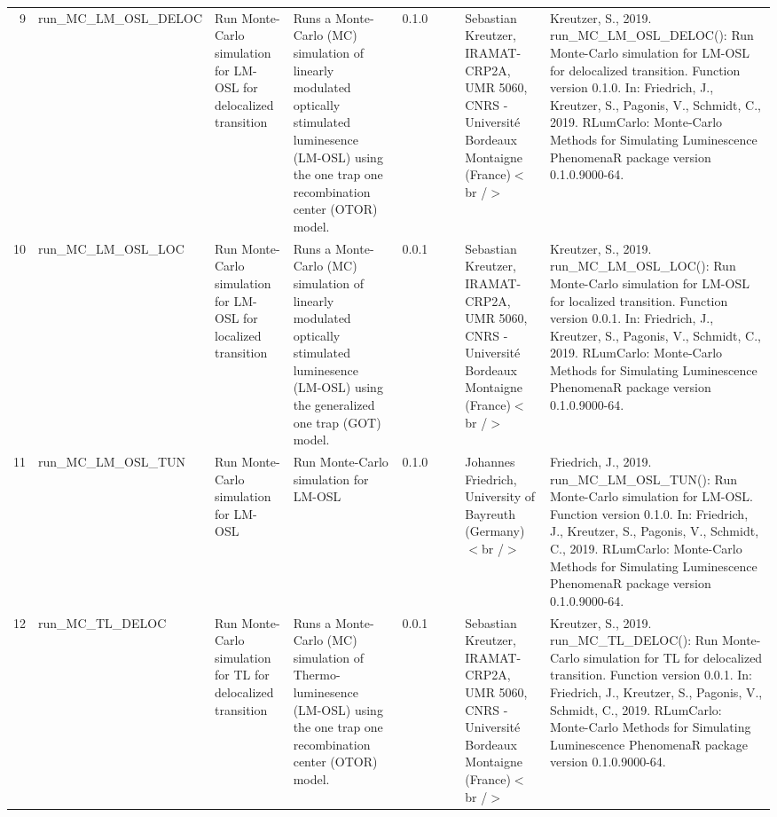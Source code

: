 \begin{table}[ht]
\begin{tabular}{rllllllll}
 \\ 
  9 & run\_MC\_LM\_OSL\_DELOC & Run Monte-Carlo simulation for LM-OSL for delocalized transition & Runs a Monte-Carlo (MC) simulation of linearly modulated optically stimulated luminesence (LM-OSL) using the one trap one recombination center (OTOR) model. & 0.1.0
 &  &  & Sebastian Kreutzer, IRAMAT-CRP2A, UMR 5060, CNRS - Université Bordeaux Montaigne (France)$<$br /$>$ & Kreutzer, S., 2019. run\_MC\_LM\_OSL\_DELOC(): Run Monte-Carlo simulation for LM-OSL for delocalized transition. Function version 0.1.0. In: Friedrich, J., Kreutzer, S., Pagonis, V., Schmidt, C., 2019. RLumCarlo: Monte-Carlo Methods for Simulating Luminescence PhenomenaR package version 0.1.0.9000-64. 
 \\ 
  10 & run\_MC\_LM\_OSL\_LOC & Run Monte-Carlo simulation for LM-OSL for localized transition & Runs a Monte-Carlo (MC) simulation of linearly modulated optically stimulated luminesence (LM-OSL) using the generalized one trap (GOT) model. & 0.0.1
 &  &  & Sebastian Kreutzer, IRAMAT-CRP2A, UMR 5060, CNRS - Université Bordeaux Montaigne (France)$<$br /$>$ & Kreutzer, S., 2019. run\_MC\_LM\_OSL\_LOC(): Run Monte-Carlo simulation for LM-OSL for localized transition. Function version 0.0.1. In: Friedrich, J., Kreutzer, S., Pagonis, V., Schmidt, C., 2019. RLumCarlo: Monte-Carlo Methods for Simulating Luminescence PhenomenaR package version 0.1.0.9000-64. 
 \\ 
  11 & run\_MC\_LM\_OSL\_TUN & Run Monte-Carlo simulation for LM-OSL & Run Monte-Carlo simulation for LM-OSL & 0.1.0
 &  &  & Johannes Friedrich, University of Bayreuth (Germany)$<$br /$>$ & Friedrich, J., 2019. run\_MC\_LM\_OSL\_TUN(): Run Monte-Carlo simulation for LM-OSL. Function version 0.1.0. In: Friedrich, J., Kreutzer, S., Pagonis, V., Schmidt, C., 2019. RLumCarlo: Monte-Carlo Methods for Simulating Luminescence PhenomenaR package version 0.1.0.9000-64. 
 \\ 
  12 & run\_MC\_TL\_DELOC & Run Monte-Carlo simulation for TL for delocalized transition & Runs a Monte-Carlo (MC) simulation of Thermo-luminesence (LM-OSL) using the one trap one recombination center (OTOR) model. & 0.0.1
 &  &  & Sebastian Kreutzer, IRAMAT-CRP2A, UMR 5060, CNRS - Université Bordeaux Montaigne (France)$<$br /$>$ & Kreutzer, S., 2019. run\_MC\_TL\_DELOC(): Run Monte-Carlo simulation for TL for delocalized transition. Function version 0.0.1. In: Friedrich, J., Kreutzer, S., Pagonis, V., Schmidt, C., 2019. RLumCarlo: Monte-Carlo Methods for Simulating Luminescence PhenomenaR package version 0.1.0.9000-64. 

\end{tabular}
\end{table}
